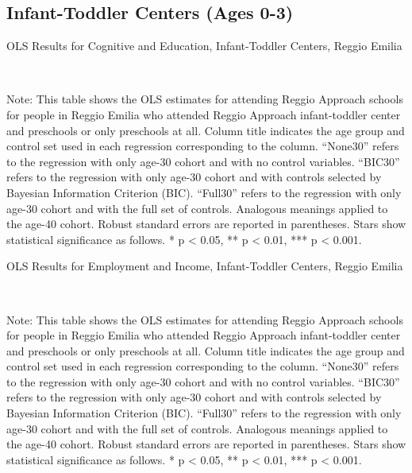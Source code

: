 \subsection{Infant-Toddler Centers (Ages 0-3)}
\begin{table}[H] \caption{OLS Results for Cognitive and Education, Infant-Toddler Centers, Reggio Emilia} \label{ols-E-itc-reg}

\vspace{1ex} \\
\footnotesize\raggedright{Note: This table shows the OLS estimates for attending Reggio Approach schools for people in Reggio Emilia who attended Reggio Approach infant-toddler center and preschools or only preschools at all. Column title indicates the age group and control set used in each regression corresponding to the column. ``None30'' refers to the regression with only age-30 cohort and with no control variables. ``BIC30'' refers to the regression with only age-30 cohort and with controls selected by Bayesian Information Criterion (BIC). ``Full30'' refers to the regression with only age-30 cohort and with the full set of controls. Analogous meanings applied to the age-40 cohort. Robust standard errors are reported in parentheses. Stars show statistical significance as follows. * p < 0.05, ** p < 0.01, *** p < 0.001.}
\end{table}

\begin{table}[H] \caption{OLS Results for Employment and Income, Infant-Toddler Centers, Reggio Emilia} \label{ols-W-itc-reg}

\vspace{1ex} \\
\footnotesize\raggedright{Note: This table shows the OLS estimates for attending Reggio Approach schools for people in Reggio Emilia who attended Reggio Approach infant-toddler center and preschools or only preschools at all. Column title indicates the age group and control set used in each regression corresponding to the column. ``None30'' refers to the regression with only age-30 cohort and with no control variables. ``BIC30'' refers to the regression with only age-30 cohort and with controls selected by Bayesian Information Criterion (BIC). ``Full30'' refers to the regression with only age-30 cohort and with the full set of controls. Analogous meanings applied to the age-40 cohort. Robust standard errors are reported in parentheses. Stars show statistical significance as follows. * p < 0.05, ** p < 0.01, *** p < 0.001.}
\end{table}


